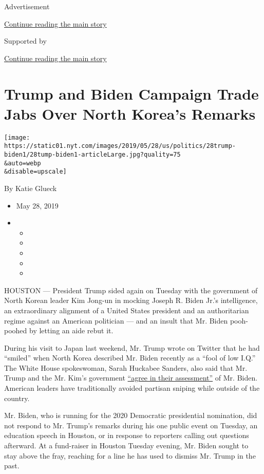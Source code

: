Advertisement

\protect\hyperlink{after-top}{Continue reading the main story}

Supported by

\protect\hyperlink{after-sponsor}{Continue reading the main story}

\hypertarget{trump-and-biden-campaign-trade-jabs-over-north-koreas-remarks}{%
\section{Trump and Biden Campaign Trade Jabs Over North Korea's
Remarks}\label{trump-and-biden-campaign-trade-jabs-over-north-koreas-remarks}}

\texttt{[image: https://static01.nyt.com/images/2019/05/28/us/politics/28trump-biden1/28tump-biden1-articleLarge.jpg?quality=75\\\&auto=webp\\\&disable=upscale]}

By Katie Glueck

\begin{itemize}
\item
  May 28, 2019
\item
  \begin{itemize}
  \item
  \item
  \item
  \item
  \item
  \end{itemize}
\end{itemize}

HOUSTON --- President Trump sided again on Tuesday with the government
of North Korean leader Kim Jong-un in mocking Joseph R. Biden Jr.'s
intelligence, an extraordinary alignment of a United States president
and an authoritarian regime against an American politician --- and an
insult that Mr. Biden pooh-poohed by letting an aide rebut it.

During his visit to Japan last weekend, Mr. Trump wrote on Twitter that
he had ``smiled'' when North Korea described Mr. Biden recently as a
``fool of low I.Q.'' The White House spokeswoman, Sarah Huckabee
Sanders, also said that Mr. Trump and the Mr. Kim's government
\href{https://www.nytimes.com/2019/05/26/us/politics/sarah-sanders-meet-the-press.html}{``agree
in their assessment''} of Mr. Biden. American leaders have traditionally
avoided partisan sniping while outside of the country.

Mr. Biden, who is running for the 2020 Democratic presidential
nomination, did not respond to Mr. Trump's remarks during his one public
event on Tuesday, an education speech in Houston, or in response to
reporters calling out questions afterward. At a fund-raiser in Houston
Tuesday evening, Mr. Biden sought to stay above the fray, reaching for a
line he has used to dismiss Mr. Trump in the past.

